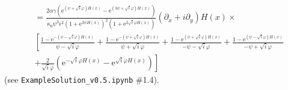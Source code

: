 \documentclass[10pt]{amsart}
\begin{document}
\begin{align}
& = 
\frac{ 2 \alpha  \gamma \left( \mathrm{e}^{\left( \psi  + \sqrt{i} \varphi \right) H(x) } - \mathrm{e}^{\left( 3 \psi  + \sqrt{i} \varphi \right) H(x) } \right)   }
 {\kappa_0  \psi^{3} \epsilon^{2} \left( 1 + \mathrm{e}^{2 \psi H(x)} \right)^{2} \left( 1 + \mathrm{e}^{2 \sqrt{i} \varphi H \left(x \right)}  \right)}
 \left( \partial_x  + i \partial_y \right) H(x) \times \nonumber \\
& \left[ 
   \frac{1 -\mathrm{e}^{-\left( \psi - \sqrt{i} \varphi \right) H(x) }} { \psi - \sqrt{i} \varphi }  
+ \frac{1 - \mathrm{e}^{-\left( \psi + \sqrt{i} \varphi \right) H(x)}}{ \psi + \sqrt{i} \varphi }
+ \frac{1 - \mathrm{e}^{\left( \psi + \sqrt{i} \varphi \right) H(x) }}{ -\psi - \sqrt{i} \varphi }  
+ \frac{1 - \mathrm{e}^{ \left( \psi - \sqrt{i} \varphi \right) H(x)}}{ -\psi + \sqrt{i} \varphi } 
\right. \nonumber \\  & \left. 
+ \frac{2}{\sqrt{i} \varphi} \left( \mathrm{e}^{-\sqrt{i} \varphi H(x) } - \mathrm{e}^{ \sqrt{i} \varphi H(x)} \right) 
\right] \nonumber
\end{align}
(see \texttt{ExampleSolution\_v0.5.ipynb} \#1.4).
\end{document}

